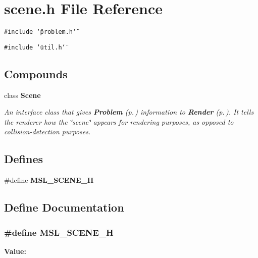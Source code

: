 \section{scene.h File Reference}
\label{scene_8h}
{\tt \#include \char`\"{}problem.h\char`\"{}}\par
{\tt \#include \char`\"{}util.h\char`\"{}}\par
\subsection*{Compounds}
\begin{CompactItemize}
\item 
class {\bf Scene}
\begin{CompactList}\small\item\em An interface class that gives {\bf Problem} {\rm (p.\,\pageref{classProblem})} information to {\bf Render} {\rm (p.\,\pageref{classRender})}. It tells the renderer how the \char`\"{}scene\char`\"{} appears for rendering purposes, as opposed to collision-detection purposes.\item\end{CompactList}\end{CompactItemize}
\subsection*{Defines}
\begin{CompactItemize}
\item 
\#define {\bf MSL\_\-SCENE\_\-H}
\end{CompactItemize}


\subsection{Define Documentation}
\subsubsection{\setlength{\rightskip}{0pt plus 5cm}\#define MSL\_\-SCENE\_\-H}\label{scene_8h_a0}


{\bf Value:}\footnotesize\begin{verbatim}
\end{verbatim}\normalsize 
